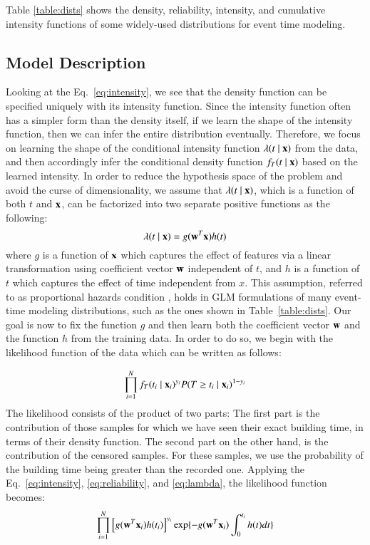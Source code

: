 Table \ref{table:dists} shows the density, reliability, intensity, and cumulative intensity functions of some widely-used distributions for event time modeling.

\subsection{Model Description}
Looking at the Eq.~\ref{eq:intensity}, we see that the density function can be specified uniquely with its intensity function. Since the intensity function often has a simpler form than the density itself, if we learn the shape of the intensity function, then we can infer the entire distribution eventually. Therefore, we focus on learning the shape of the conditional intensity function $\lambda(t\mid \mathbf{x})$ from the data, and then accordingly infer the conditional density function $f_T(t\mid \mathbf{x})$ based on the learned intensity.
In order to reduce the hypothesis space of the problem and avoid the curse of dimensionality, we assume that $\lambda(t\mid \mathbf{x})$, which is a function of both $t$ and $\mathbf{x}$, can be factorized into two separate positive functions as the following:
\begin{equation}\label{eq:lambda}
\lambda(t\mid \mb{x})=g(\mb{w}^T\mb{x})h(t)
\end{equation}
where $g$ is a function of $\mathbf{x}$ which captures the effect of features via a linear transformation using coefficient vector $\mathbf{w}$ independent of $t$, and $h$ is a function of $t$ which captures the effect of time independent from $x$. This assumption, referred to as proportional hazards condition \cite{breslow1975analysis}, holds in GLM formulations of many event-time modeling distributions, such as the ones shown in Table~\ref{table:dists}. Our goal is now to fix the function $g$ and then learn both the coefficient vector $\mathbf{w}$ and the function $h$ from the training data. In order to do so, we begin with the likelihood function of the data which can be written as follows:

\begin{equation}
\prod_{i=1}^{N}f_T(t_i\mid \mathbf{x}_i)^{y_i}P(T\ge t_i\mid \mathbf{x}_i)^{1-y_i}\\
\end{equation}
The likelihood consists of the product of two parts: The first part is the contribution of those samples for which we have seen their exact building time, in terms of their density function. The second part on the other hand, is the contribution of the censored samples. For these samples, we use the probability of the building time being greater than the recorded one. Applying the Eq.~\ref{eq:intensity}, \ref{eq:reliability}, and \ref{eq:lambda}, the likelihood function becomes:
\begin{equation}
\prod_{i=1}^{N}\left[g(\mathbf{w}^T\mathbf{x}_i)h(t_i)\right]^{y_i}\exp\lbrace-g(\mathbf{w}^T\mathbf{x}_i)\int_{0}^{t_i}h(t)dt\rbrace
\end{equation}

